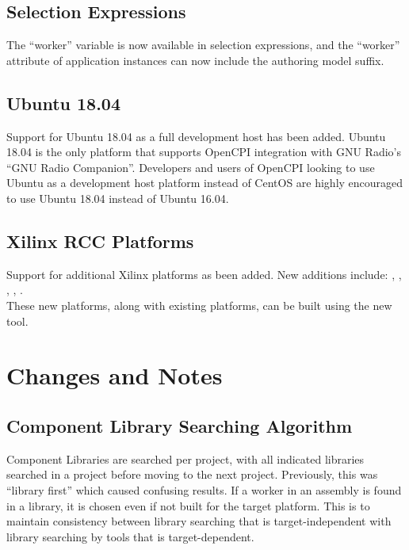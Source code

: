 \subsection{Selection Expressions}
\label{sec:20_selection_expressions}
The ``worker'' variable is now available in selection expressions, and the ``worker'' attribute of application instances can now include the authoring model suffix.

\subsection{Ubuntu 18.04}
\label{sec:20_ubuntu18}
Support for Ubuntu 18.04 as a full development host has been added. Ubuntu 18.04 is the only platform that supports OpenCPI integration with GNU Radio's ``GNU Radio Companion''. Developers and users of OpenCPI looking to use Ubuntu as a development host platform instead of CentOS are highly encouraged to use Ubuntu 18.04 instead of Ubuntu 16.04.

\subsection{Xilinx RCC Platforms}
\label{sec:20_xilinx_rcc_platforms}
Support for additional Xilinx platforms as been added. New additions include: , , , , .\\

These new platforms, along with existing platforms, can be built using the new  tool.


\section{Changes and Notes}

\subsection{Component Library Searching Algorithm}
\label{sec:20_component_library_searching}
Component Libraries are searched per project, with all indicated libraries searched in a project before moving to the next project. Previously, this was ``library first'' which caused confusing results. If a worker in an assembly is found in a library, it is chosen even if not built for the target platform. This is to maintain consistency between library searching that is target-independent with library searching by tools that is target-dependent.

